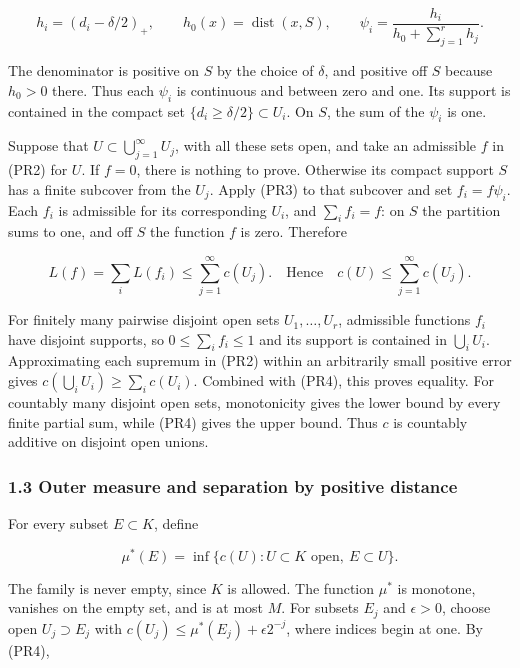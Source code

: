 \documentclass[
  11pt,
]{article}
\begin{document}
\[
h_i=(d_i-\delta/2)_+,\qquad h_0(x)=\operatorname{dist}(x,S),\qquad
\psi_i=\frac{h_i}{h_0+\sum_{j=1}^rh_j}.
\tag{PR3}
\]

The denominator is positive on \(S\) by the choice of \(\delta\), and
positive off \(S\) because \(h_0>0\) there. Thus each \(\psi_i\) is
continuous and between zero and one. Its support is contained in the
compact set \(\{d_i\geq\delta/2\}\subset U_i\). On \(S\), the sum of the
\(\psi_i\) is one.

Suppose that \(U\subset\bigcup_{j=1}^\infty U_j\), with all these sets
open, and take an admissible \(f\) in (PR2) for \(U\). If \(f=0\), there
is nothing to prove. Otherwise its compact support \(S\) has a finite
subcover from the \(U_j\). Apply (PR3) to that subcover and set
\(f_i=f\psi_i\). Each \(f_i\) is admissible for its corresponding
\(U_i\), and \(\sum_i f_i=f\): on \(S\) the partition sums to one, and
off \(S\) the function \(f\) is zero. Therefore

\[
L(f)=\sum_iL(f_i)\leq\sum_{j=1}^\infty c(U_j).
\quad\text{Hence}\quad
c(U)\leq\sum_{j=1}^\infty c(U_j).
\tag{PR4}
\]

For finitely many pairwise disjoint open sets \(U_1,\ldots,U_r\),
admissible functions \(f_i\) have disjoint supports, so
\(0\leq\sum_i f_i\leq1\) and its support is contained in
\(\bigcup_iU_i\). Approximating each supremum in (PR2) within an
arbitrarily small positive error gives
\(c(\bigcup_iU_i)\geq\sum_i c(U_i)\). Combined with (PR4), this proves
equality. For countably many disjoint open sets, monotonicity gives the
lower bound by every finite partial sum, while (PR4) gives the upper
bound. Thus \(c\) is countably additive on disjoint open unions.

\subsubsection{1.3 Outer measure and separation by positive
distance}\label{outer-measure-and-separation-by-positive-distance}

For every subset \(E\subset K\), define

\[
\mu^*(E)=\inf\{c(U):U\subset K\text{ open},\ E\subset U\}.
\tag{PR5}
\]

The family is never empty, since \(K\) is allowed. The function
\(\mu^*\) is monotone, vanishes on the empty set, and is at most \(M\).
For subsets \(E_j\) and \(\epsilon>0\), choose open \(U_j\supset E_j\)
with \(c(U_j)\leq\mu^*(E_j)+\epsilon2^{-j}\), where indices begin at
one. By (PR4),
\end{document}
